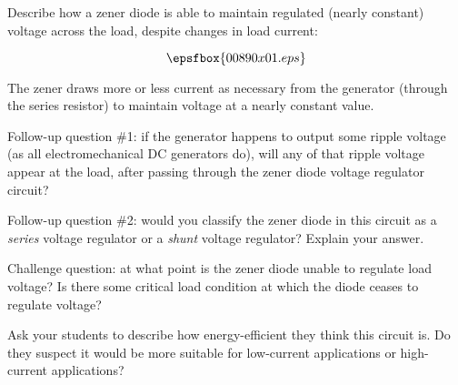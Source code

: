 

Describe how a zener diode is able to maintain regulated (nearly constant) voltage across the load, despite changes in load current:

$$\epsfbox{00890x01.eps}$$







The zener draws more or less current as necessary from the generator (through the series resistor) to maintain voltage at a nearly constant value.

\vskip 10pt

Follow-up question \#1: if the generator happens to output some ripple voltage (as all electromechanical DC generators do), will any of that ripple voltage appear at the load, after passing through the zener diode voltage regulator circuit?

\vskip 10pt

Follow-up question \#2: would you classify the zener diode in this circuit as a {\it series} voltage regulator or a {\it shunt} voltage regulator?  Explain your answer.

\vskip 10pt

Challenge question: at what point is the zener diode unable to regulate load voltage?  Is there some critical load condition at which the diode ceases to regulate voltage?







Ask your students to describe how energy-efficient they think this circuit is.  Do they suspect it would be more suitable for low-current applications or high-current applications?




